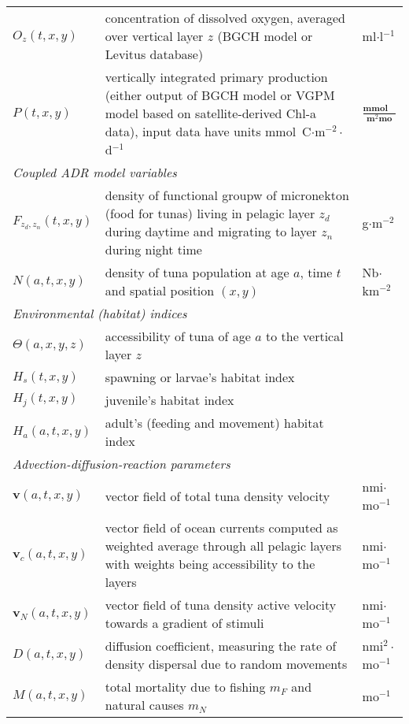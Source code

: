 \begin{longtable}{lp{11cm}l}
 $O_z(t,x,y)$		& concentration of dissolved oxygen, averaged over vertical layer $z$ (BGCH model or Levitus database)		&ml$\cdot$l$^{-1}$\\
 $P(t,x,y)$ 		  & vertically integrated primary production (either output of BGCH model or VGPM model based on satellite-derived Chl-a data), input data have units mmol~C$\cdot$m$^{-2}\cdot$d$^{-1}$      &\makecell{\\ $\frac{\textbf{mmol C}}{\textbf{m}^2 \textbf{mo}}$}\\
\cline{1-3}
\multicolumn{3}{l}{\textit {Coupled ADR model variables}}\\
\cline{1-3}
 $F_{z_d,z_n}(t,x,y)$ & density of functional groupw of micronekton (food for tunas) living in pelagic layer $z_d$ during daytime and migrating to layer $z_n$ during night time		&\makecell{\\g$\cdot$m$^{-2}$}\\
 $N(a,t,x,y)$  & density of tuna population at age $a$, time $t$ and spatial position $(x,y)$	 	& Nb$\cdot$km$^{-2}$ \\
\cline{1-3}
 \multicolumn{3}{l}{\textit {Environmental (habitat) indices}}\\
\cline{1-3}
 $\Theta(a,x,y,z)$ & accessibility of tuna of age $a$ to the vertical layer $z$\\
 $H_s(t,x,y)$ 	& spawning or larvae's habitat index\\
 $H_j(t,x,y)$ 	& juvenile's habitat index\\
 $H_a(a,t,x,y)$ 	& adult's (feeding and movement) habitat index\\
\cline{1-3}
\multicolumn{3}{l}{\textit {Advection-diffusion-reaction parameters}}\\
\cline{1-3}
 $\mathbf{v}(a,t,x,y)$ 	& vector field of total tuna density velocity								  & nmi$\cdot$mo$^{-1}$\\
 $\mathbf{v}_c(a,t,x,y)$ 	& vector field of ocean currents computed as weighted average through all pelagic layers with weights being accessibility to the layers & nmi$\cdot$mo$^{-1}$\\
 $\mathbf{v}_N(a,t,x,y)$ 	& vector field of tuna density active velocity towards a gradient of stimuli  & nmi$\cdot$mo$^{-1}$\\
 $D(a,t,x,y)$ 	& diffusion coefficient, measuring the rate of density dispersal due to random movements 										& nmi$^2\cdot$mo$^{-1}$\\
 $M(a,t,x,y)$ 	& total mortality due to fishing $m_F$ and natural causes $m_N$		& mo$^{-1}$\\

\end{longtable}
